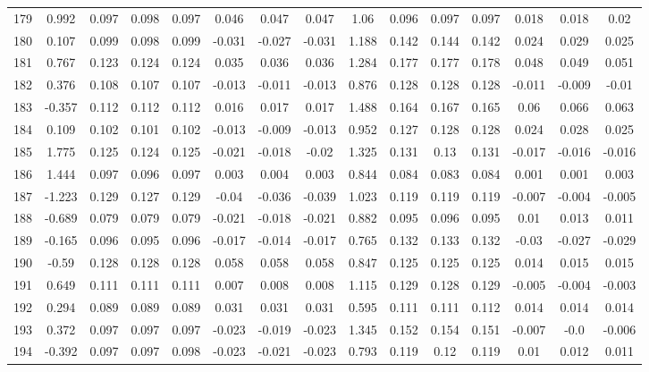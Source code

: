 \begin{table}[H]
{\begin{tabular}{l|c|ccc|ccc|c|ccc|ccc}
			179 & 0.992 & 0.097 & 0.098 & 0.097 & 0.046 & 0.047 & 0.047 & 1.06 & 0.096 & 0.097 & 0.097 & 0.018 & 0.018 & 0.02 \\
			180 & 0.107 & 0.099 & 0.098 & 0.099 & -0.031 & -0.027 & -0.031 & 1.188 & 0.142 & 0.144 & 0.142 & 0.024 & 0.029 & 0.025 \\
			181 & 0.767 & 0.123 & 0.124 & 0.124 & 0.035 & 0.036 & 0.036 & 1.284 & 0.177 & 0.177 & 0.178 & 0.048 & 0.049 & 0.051 \\
			182 & 0.376 & 0.108 & 0.107 & 0.107 & -0.013 & -0.011 & -0.013 & 0.876 & 0.128 & 0.128 & 0.128 & -0.011 & -0.009 & -0.01 \\
			183 & -0.357 & 0.112 & 0.112 & 0.112 & 0.016 & 0.017 & 0.017 & 1.488 & 0.164 & 0.167 & 0.165 & 0.06 & 0.066 & 0.063 \\
			184 & 0.109 & 0.102 & 0.101 & 0.102 & -0.013 & -0.009 & -0.013 & 0.952 & 0.127 & 0.128 & 0.128 & 0.024 & 0.028 & 0.025 \\
			185 & 1.775 & 0.125 & 0.124 & 0.125 & -0.021 & -0.018 & -0.02 & 1.325 & 0.131 & 0.13 & 0.131 & -0.017 & -0.016 & -0.016 \\
			186 & 1.444 & 0.097 & 0.096 & 0.097 & 0.003 & 0.004 & 0.003 & 0.844 & 0.084 & 0.083 & 0.084 & 0.001 & 0.001 & 0.003 \\
			187 & -1.223 & 0.129 & 0.127 & 0.129 & -0.04 & -0.036 & -0.039 & 1.023 & 0.119 & 0.119 & 0.119 & -0.007 & -0.004 & -0.005 \\
			188 & -0.689 & 0.079 & 0.079 & 0.079 & -0.021 & -0.018 & -0.021 & 0.882 & 0.095 & 0.096 & 0.095 & 0.01 & 0.013 & 0.011 \\
			189 & -0.165 & 0.096 & 0.095 & 0.096 & -0.017 & -0.014 & -0.017 & 0.765 & 0.132 & 0.133 & 0.132 & -0.03 & -0.027 & -0.029 \\
			190 & -0.59 & 0.128 & 0.128 & 0.128 & 0.058 & 0.058 & 0.058 & 0.847 & 0.125 & 0.125 & 0.125 & 0.014 & 0.015 & 0.015 \\
			191 & 0.649 & 0.111 & 0.111 & 0.111 & 0.007 & 0.008 & 0.008 & 1.115 & 0.129 & 0.128 & 0.129 & -0.005 & -0.004 & -0.003 \\
			192 & 0.294 & 0.089 & 0.089 & 0.089 & 0.031 & 0.031 & 0.031 & 0.595 & 0.111 & 0.111 & 0.112 & 0.014 & 0.014 & 0.014 \\
			193 & 0.372 & 0.097 & 0.097 & 0.097 & -0.023 & -0.019 & -0.023 & 1.345 & 0.152 & 0.154 & 0.151 & -0.007 & -0.0 & -0.006 \\
			194 & -0.392 & 0.097 & 0.097 & 0.098 & -0.023 & -0.021 & -0.023 & 0.793 & 0.119 & 0.12 & 0.119 & 0.01 & 0.012 & 0.011 \\

\end{tabular}}
\end{table}

